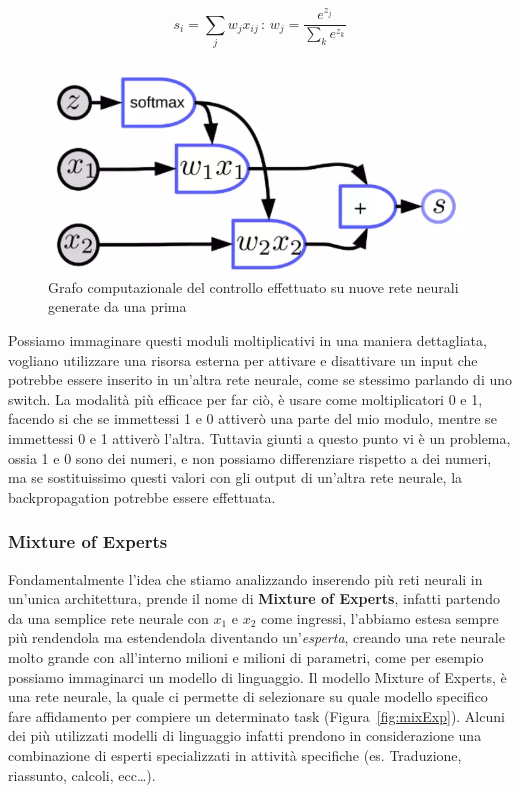 \begin{equation}
    s_i = \sum_jw_jx_{ij} \,:\,w_j=\frac{e^{z_{j}}}{\sum_ke^{z_k}}
    \label{eq:attentionMod}
\end{equation}

\begin{figure}
    \centering
    \includegraphics[width=0.35\linewidth]{figure/AttentionModule.png}
    \caption{Grafo computazionale del controllo effettuato su nuove rete neurali generate da una prima}
    \label{fig:AttentionMod}
\end{figure}

Possiamo immaginare questi moduli moltiplicativi in una maniera dettagliata, vogliano utilizzare una risorsa esterna per attivare e disattivare un input che potrebbe essere inserito in un'altra rete neurale, come se stessimo parlando di uno switch. La modalità più efficace per far ciò, è usare come moltiplicatori 0 e 1, facendo si che se immettessi 1 e 0 attiverò una parte del mio modulo, mentre se immettessi 0 e 1 attiverò l'altra. Tuttavia giunti a questo punto vi è un problema, ossia 1 e 0 sono dei numeri, e non possiamo differenziare rispetto a dei numeri, ma se sostituissimo questi valori con gli output di un'altra rete neurale, la backpropagation potrebbe essere effettuata.

\subsubsection{Mixture of Experts}
Fondamentalmente l'idea che stiamo analizzando inserendo più reti neurali in un'unica architettura, prende il nome di \textbf{Mixture of Experts}, infatti partendo da una semplice rete neurale con $x_1$ e $x_2$ come ingressi, l'abbiamo estesa sempre più rendendola ma estendendola diventando un'\textit{esperta}, creando una rete neurale molto grande con all'interno milioni e milioni di parametri, come per esempio possiamo immaginarci un modello di linguaggio. Il modello Mixture of Experts, è una rete neurale, la quale ci permette di selezionare su quale modello specifico fare affidamento per compiere un determinato task (Figura~\ref{fig:mixExp}). Alcuni dei più utilizzati modelli di linguaggio infatti prendono in considerazione una combinazione di esperti specializzati in attività specifiche (es. Traduzione, riassunto, calcoli, ecc\dots). 

